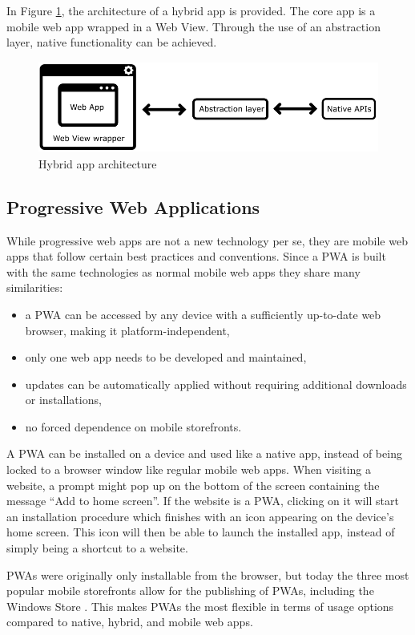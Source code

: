 \documentclass[a4paper,12pt]{article}
\begin{document}
In Figure \ref{fig:hybridapp}, the architecture of a hybrid app is provided. The core app is a mobile web app wrapped in a Web View. Through the use of an abstraction layer, native functionality can be achieved.

\begin{figure}[h]%
	\centering
	\includegraphics[height=3cm]{img/Other/struct_hybrid.png}
	\caption{Hybrid app architecture}%
	\label{fig:hybridapp}%
\end{figure}

\subsection{Progressive Web Applications}
\label{Theory_PWA}
While progressive web apps are not a new technology per se, they are mobile web apps that follow certain best practices and conventions. Since a PWA is built with the same technologies as normal mobile web apps they share many similarities:

\begin{itemize}
    \item a PWA can be accessed by any device with a sufficiently up-to-date web browser, making it platform-independent,
    \item only one web app needs to be developed and maintained,
    \item updates can be automatically applied without requiring additional downloads or installations,
    \item no forced dependence on mobile storefronts.
\end{itemize}

A PWA can be installed on a device and used like a native app, instead of being locked to a browser window like regular mobile web apps. When visiting a website, a prompt might pop up on the bottom of the screen containing the message “Add to home screen”. If the website is a PWA, clicking on it will start an installation procedure which finishes with an icon appearing on the device’s home screen. This icon will then be able to launch the installed app, instead of simply being a shortcut to a website.

PWAs were originally only installable from the browser, but today the three most popular mobile storefronts allow for the publishing of PWAs, including the Windows Store \cite{how_to_publish_pwa_in_stores}. This makes PWAs the most flexible in terms of usage options compared to native, hybrid, and mobile web apps.
\end{document}
